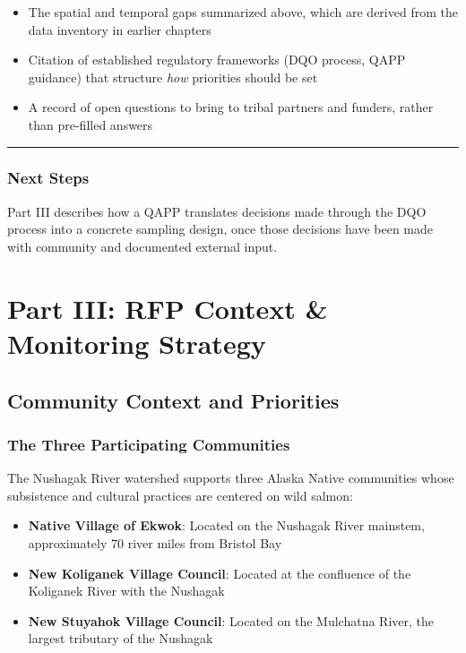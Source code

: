 \documentclass[
  letterpaper,
]{scrbook}
\providecommand{\tightlist}{%
  \setlength{\itemsep}{0pt}\setlength{\parskip}{0pt}}\usepackage{longtable,booktabs,array}
\begin{document}
\begin{itemize}
\tightlist
\item
  The spatial and temporal gaps summarized above, which are derived from
  the data inventory in earlier chapters
\item
  Citation of established regulatory frameworks (DQO process, QAPP
  guidance) that structure \emph{how} priorities should be set
\item
  A record of open questions to bring to tribal partners and funders,
  rather than pre-filled answers
\end{itemize}

\begin{center}\rule{0.5\linewidth}{0.5pt}\end{center}

\section{Next Steps}\label{next-steps}

Part III describes how a QAPP translates decisions made through the DQO
process into a concrete sampling design, once those decisions have been
made with community and documented external input.

\part{Part III: RFP Context \& Monitoring Strategy}

\chapter{Community Context and
Priorities}\label{community-context-and-priorities}

\section{The Three Participating
Communities}\label{the-three-participating-communities}

The Nushagak River watershed supports three Alaska Native communities
whose subsistence and cultural practices are centered on wild salmon:

\begin{itemize}
\tightlist
\item
  \textbf{Native Village of Ekwok}: Located on the Nushagak River
  mainstem, approximately 70 river miles from Bristol Bay
\item
  \textbf{New Koliganek Village Council}: Located at the confluence of
  the Koliganek River with the Nushagak
\item
  \textbf{New Stuyahok Village Council}: Located on the Mulchatna River,
  the largest tributary of the Nushagak
\end{itemize}
\end{document}
